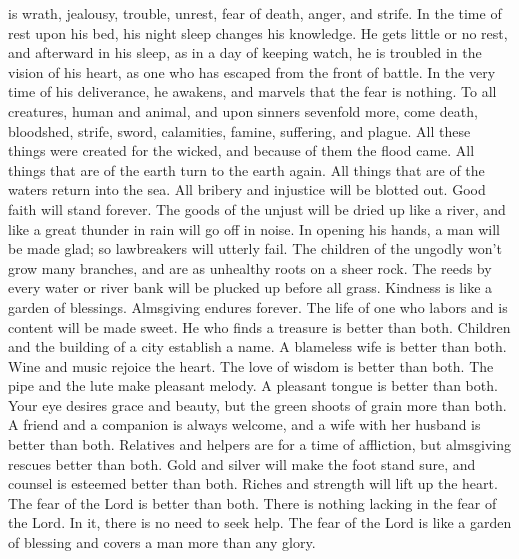 is wrath, jealousy, trouble, unrest, fear of death, anger, and strife.
In the time of rest upon his bed, his night sleep changes his knowledge.
 He gets little or no rest, and afterward in his sleep, as
in a day of keeping watch, he is troubled in the vision of his heart, as
one who has escaped from the front of battle.  In the very
time of his deliverance, he awakens, and marvels that the fear is
nothing.  To all creatures, human and animal, and upon
sinners sevenfold more,  come death, bloodshed, strife,
sword, calamities, famine, suffering, and plague.  All
these things were created for the wicked, and because of them the flood
came.  All things that are of the earth turn to the earth
again. All things that are of the waters return into the sea.
 All bribery and injustice will be blotted out. Good
faith will stand forever.  The goods of the unjust will
be dried up like a river, and like a great thunder in rain will go off
in noise.  In opening his hands, a man will be made glad;
so lawbreakers will utterly fail.  The children of the
ungodly won't grow many branches, and are as unhealthy roots on a sheer
rock.  The reeds by every water or river bank will be
plucked up before all grass.  Kindness is like a garden
of blessings. Almsgiving endures forever.  The life of
one who labors and is content will be made sweet. He who finds a
treasure is better than both.  Children and the building
of a city establish a name. A blameless wife is better than both.
 Wine and music rejoice the heart. The love of wisdom is
better than both.  The pipe and the lute make pleasant
melody. A pleasant tongue is better than both.  Your eye
desires grace and beauty, but the green shoots of grain more than both.
 A friend and a companion is always welcome, and a wife
with her husband is better than both.  Relatives and
helpers are for a time of affliction, but almsgiving rescues better than
both.  Gold and silver will make the foot stand sure, and
counsel is esteemed better than both.  Riches and
strength will lift up the heart. The fear of the Lord is better than
both. There is nothing lacking in the fear of the Lord. In it, there is
no need to seek help.  The fear of the Lord is like a
garden of blessing and covers a man more than any glory. 
